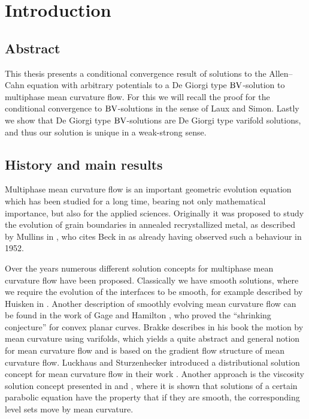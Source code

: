 \chapter{Introduction}

\section{Abstract}

This thesis presents a conditional convergence result of solutions to the 
Allen--Cahn equation with arbitrary potentials to a De Giorgi type $ \operatorname{BV} 
$-solution to multiphase mean 
curvature flow. For this we will recall the proof for the conditional 
convergence to $ \operatorname{BV} $-solutions in 
the sense of Laux and Simon. Lastly we show that De Giorgi type $ \operatorname{BV} 
$-solutions are De Giorgi type varifold solutions, and thus our solution 
is unique in a weak-strong sense.

\section{History and main results}

Multiphase mean curvature flow is an important geometric evolution equation 
which 
has been studied for a long time, bearing not only mathematical importance, but 
also for the applied sciences. Originally it was proposed to study the 
evolution of grain boundaries in annealed recrystallized metal, as described by
Mullins in \cite{mullins_two_dimensional_motion_of_idealized_grain_boundaries}, 
who cites Beck in \cite{beck_metal_interfaces} as already having observed such 
a behaviour in 1952. 

Over the years numerous different solution concepts for multiphase mean 
curvature flow have been proposed. Classically we have smooth solutions, where 
we require the evolution of the interfaces to be smooth, for example described 
by Huisken 
in \cite{huisken_asymptotic_behavior_for_singuliarities_of_mcf}. 
Another description of smoothly evolving mean curvature flow can be found in 
the work of Gage and Hamilton 
\cite{gage_hamilton_the_heat_equation_shrinking_convex_plane_curves}, who 
proved the \enquote{shrinking conjecture} for convex planar curves.
Brakke describes in his book 
\cite{brakke_kenneth_motion_of_surface_by_mean_curvature} the motion by mean 
curvature using varifolds, which yields a quite abstract and general notion for 
mean curvature flow and is based on the gradient flow structure of mean 
curvature flow. 
Luckhaus and Sturzenhecker introduced a 
distributional solution concept for mean curvature flow in their work 
\cite{luckhaus_sturzenhecker_implicit_time_discretization_for_mcf}. Another 
approach is the viscosity solution concept presented in 
\cite{chen_giga_goto_uniqueness_and_existence_of_generalized_mcf_equations} and
\cite{evans_spruck_motion_of_level_sets_by_mean_curvature}, where it is shown 
that solutions of a certain parabolic equation have the property that if they 
are smooth, the corresponding level sets move by mean curvature.

